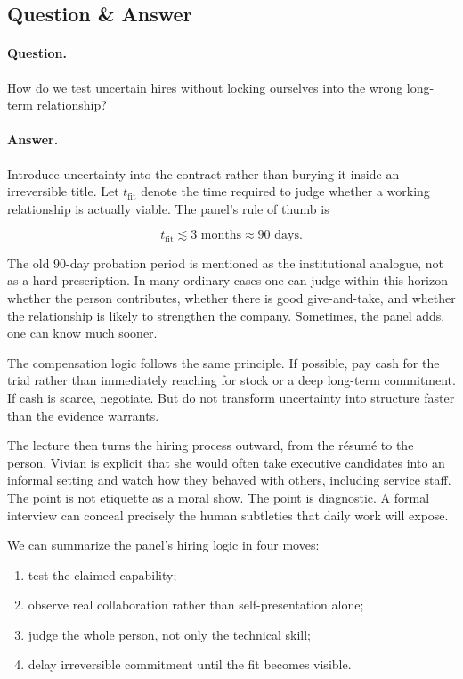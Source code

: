 \subsection{Question \& Answer}

\paragraph{Question.} How do we test uncertain hires without locking ourselves into the wrong long-term relationship?

\paragraph{Answer.} Introduce uncertainty into the contract rather than burying it inside an irreversible title. Let \(t_{\mathrm{fit}}\) denote the time required to judge whether a working relationship is actually viable. The panel's rule of thumb is

\begin{equation}
t_{\mathrm{fit}} \lesssim 3\text{ months} \approx 90\text{ days}.
\end{equation}

The old \(90\)-day probation period is mentioned as the institutional analogue, not as a hard prescription. In many ordinary cases one can judge within this horizon whether the person contributes, whether there is good give-and-take, and whether the relationship is likely to strengthen the company. Sometimes, the panel adds, one can know much sooner.

The compensation logic follows the same principle. If possible, pay cash for the trial rather than immediately reaching for stock or a deep long-term commitment. If cash is scarce, negotiate. But do not transform uncertainty into structure faster than the evidence warrants.

The lecture then turns the hiring process outward, from the résumé to the person. Vivian is explicit that she would often take executive candidates into an informal setting and watch how they behaved with others, including service staff. The point is not etiquette as a moral show. The point is diagnostic. A formal interview can conceal precisely the human subtleties that daily work will expose.

We can summarize the panel's hiring logic in four moves:

\begin{enumerate}
\item test the claimed capability;
\item observe real collaboration rather than self-presentation alone;
\item judge the whole person, not only the technical skill;
\item delay irreversible commitment until the fit becomes visible.
\end{enumerate}

